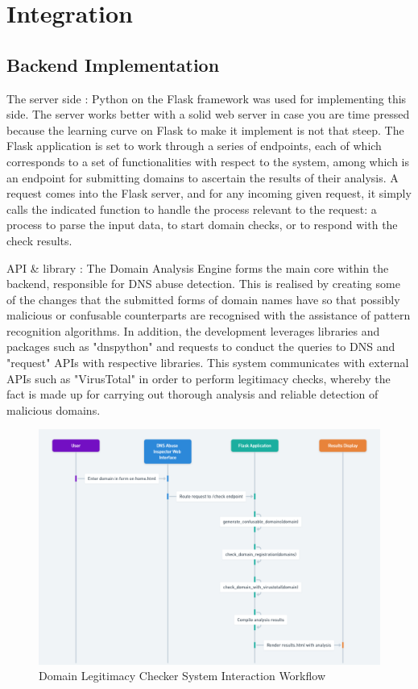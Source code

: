 \section{Integration} 
\subsection{Backend Implementation}

The server side :  Python on the Flask framework was used for implementing this side. The server works better with a solid web server in case you are time pressed because the learning curve on Flask to make it implement is not that steep. The Flask application is set to work through a series of endpoints, each of which corresponds to a set of functionalities with respect to the system, among which is an endpoint for submitting domains to ascertain the results of their analysis. A request comes into the Flask server, and for any incoming given request, it simply calls the indicated function to handle the process relevant to the request: a process to parse the input data, to start domain checks, or to respond with the check results.

 API \& library : The Domain Analysis Engine forms the main core within the backend, responsible for DNS abuse detection. This is realised by creating some of the changes that the submitted forms of domain names have so that possibly malicious or confusable counterparts are recognised with the assistance of pattern recognition algorithms. In addition, the development leverages libraries and packages such as "dnspython" and requests to conduct the queries to DNS and "request" APIs with respective libraries. This system communicates with external APIs such as "VirusTotal" in order to perform legitimacy checks, whereby the fact is made up for carrying out thorough analysis and reliable detection of malicious domains.

 \begin{figure}[H]
     \centering
     \includegraphics[width=1\linewidth]{project/Domain Legitimacy Check Workflow.png}
     \caption{Domain Legitimacy Checker System Interaction Workflow}
     \label{fig:figfigfig}
 \end{figure}

